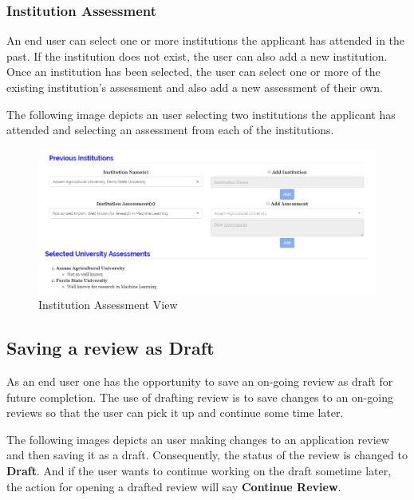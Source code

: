 \documentclass[fontsize=12pt,paper=letter,twoside]{scrartcl}
\begin{document}
\subsubsection{Institution Assessment}
An end user can select one or more institutions the applicant has attended in the past. If the institution does not exist, the user can also add a new institution. Once an institution has been selected, the user can select one or more of the existing institution's assessment and also add a new assessment of their own.

\bigskip
\noindent The following image depicts an user selecting two institutions the applicant has attended and selecting an assessment from each of the institutions.

\begin{figure}[!htb]
\begin{center}
\includegraphics[width=.7\textwidth]{images/uni_assessment.png}
\end{center}
\caption{Institution Assessment View}
\label{fig:uni_assessment}
\end{figure}

\clearpage
\newpage
\subsection{Saving a review as Draft}
As an end user one has the opportunity to save an on-going review as draft for future completion. The use of drafting review is to save changes to an on-going reviews so that the user can pick it up and continue some time later.

\bigskip
\noindent The following images depicts an user making changes to an application review and then saving it as a draft. Consequently, the status of the review is changed to \textbf{Draft}. And if the user wants to continue working on the draft sometime later, the action for opening a drafted review will say \textbf{Continue Review}.
\end{document}
